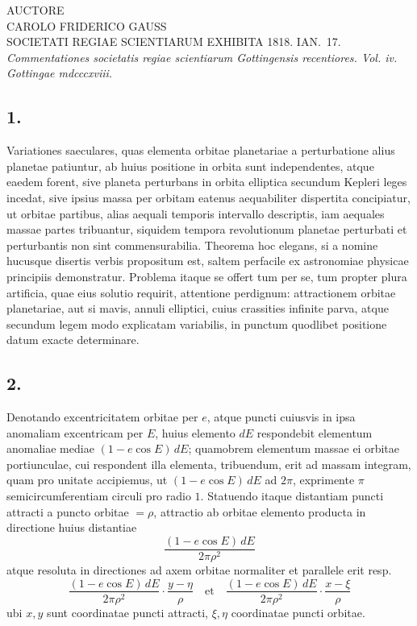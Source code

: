 \documentclass[12pt,a4paper]{article}
\theoremstyle{plain}
\begin{document}
\begin{center} AUCTORE\\
CAROLO FRIDERICO GAUSS\\[6pt] SOCIETATI REGIAE SCIENTIARUM EXHIBITA 1818. IAN.\ 17.\\[6pt]
\textit{Commentationes societatis regiae scientiarum Gottingensis recentiores. Vol. iv.\\
Gottingae mdcccxviii.}
\end{center}

\subsection*{1.}

Variationes saeculares, quas elementa orbitae planetariae a perturbatione alius planetae patiuntur, ab huius positione in orbita sunt independentes, atque
eaedem forent, sive planeta perturbans in orbita elliptica secundum Kepleri leges incedat, sive ipsius massa per orbitam eatenus aequabiliter dispertita concipiatur,
ut orbitae partibus, alias aequali temporis intervallo descriptis, iam aequales massae partes tribuantur, siquidem tempora revolutionum planetae perturbati et perturbantis
non sint commensurabilia. Theorema hoc elegans, si a nomine hucusque disertis verbis propositum est, saltem perfacile ex astronomiae physicae principiis demonstratur.
Problema itaque se offert tum per se, tum propter plura artificia, quae eius solutio requirit, attentione perdignum: attractionem orbitae planetariae, aut si mavis,
annuli elliptici, cuius crassities infinite parva, atque secundum legem modo explicatam variabilis, in punctum quodlibet positione datum exacte determinare.

\subsection*{2.}

Denotando excentricitatem orbitae per $e$, atque puncti cuiusvis in ipsa anomaliam excentricam per $E$, huius elemento $dE$ respondebit elementum anomaliae
mediae $(1 - e\cos E)\,dE$; quamobrem elementum massae ei orbitae portiunculae, cui respondent illa elementa, tribuendum, erit ad massam integram, quam pro
unitate accipiemus, ut $(1 - e\cos E)\,dE$ ad $2\pi$, exprimente $\pi$ semicircumferentiam circuli pro radio $1$. Statuendo itaque distantiam puncti attracti a puncto orbitae
$= \rho$, attractio ab orbitae elemento producta in directione huius distantiae
\[\frac{(1-e\cos E)\,dE}{2\pi\rho^2}\]
atque resoluta in directiones ad axem orbitae normaliter et parallele erit resp.
\[
\frac{(1-e\cos E)\,dE}{2\pi\rho^2}\cdot\frac{y-\eta}{\rho}\quad\text{et}\quad
\frac{(1-e\cos E)\,dE}{2\pi\rho^2}\cdot\frac{x-\xi}{\rho}
\]
ubi $x, y$ sunt coordinatae puncti attracti, $\xi, \eta$ coordinatae puncti orbitae.
\end{document}
